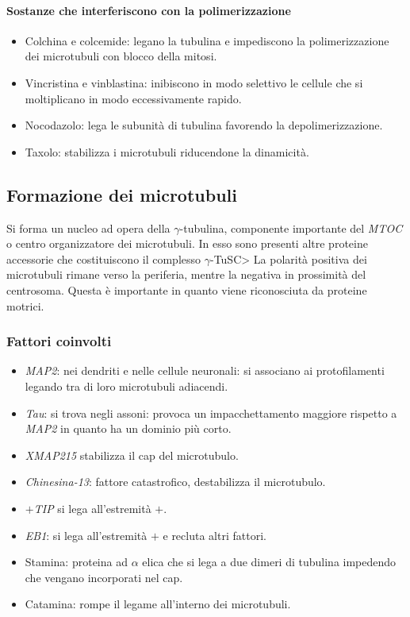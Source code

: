 			\paragraph{Sostanze che interferiscono con la polimerizzazione}
			\begin{multicols}{2}
				\begin{itemize}
					\item Colchina e colcemide: legano la tubulina e impediscono la polimerizzazione dei microtubuli con blocco della mitosi.
					\item Vincristina e vinblastina: inibiscono in modo selettivo le cellule che si moltiplicano in modo eccessivamente rapido.
					\item Nocodazolo: lega le subunit\`a di tubulina favorendo la depolimerizzazione.
					\item Taxolo: stabilizza i microtubuli riducendone la dinamicit\`a.
				\end{itemize}
			\end{multicols}
	
	\subsection{Formazione dei microtubuli}
	Si forma un nucleo ad opera della $\gamma$-tubulina, componente importante del \emph{MTOC} o centro organizzatore dei microtubuli.
	In esso sono presenti altre proteine accessorie che costituiscono il complesso $\gamma$-TuSC>
	La polarit\`a positiva dei microtubuli rimane verso la periferia, mentre la negativa in prossimit\`a del centrosoma.
	Questa \`e importante in quanto viene riconosciuta da proteine motrici.

		\subsubsection{Fattori coinvolti}
		\begin{multicols}{2}
			\begin{itemize}
				\item \emph{MAP2}: nei dendriti e nelle cellule neuronali: si associano ai protofilamenti legando tra di loro microtubuli adiacendi.
				\item \emph{Tau}: si trova negli assoni: provoca un impacchettamento maggiore rispetto a \emph{MAP2} in quanto ha un dominio pi\`u corto.
				\item \emph{XMAP215} stabilizza il cap del microtubulo.
				\item \emph{Chinesina-13}: fattore catastrofico, destabilizza il microtubulo.
				\item \emph{$+$TIP} si lega all'estremit\`a $+$.
				\item \emph{EB1}: si lega all'estremit\`a $+$ e recluta altri fattori.
				\item Stamina: proteina ad $\alpha$ elica che si lega a due dimeri di tubulina impedendo che vengano incorporati nel cap.
				\item Catamina: rompe il legame all'interno dei microtubuli.
			\end{itemize}
		\end{multicols}

